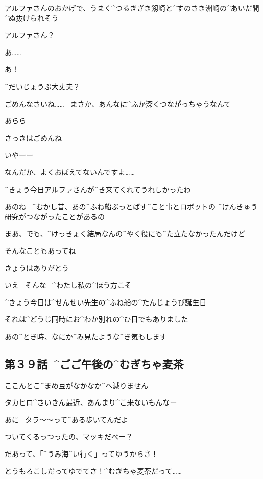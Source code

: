 \page
\Sensei アルファさんのおかげで、うまく^{つるぎざき}{剱崎}と^{すのさき}{洲崎}の^{あいだ}{間}^{ぬ}{抜}けられそう

\Sensei アルファさん？

\page[94]
\Alpha あ……

\Sensei あ！

\Sensei ^{だいじょうぶ}{大丈夫}？

\Sensei ごめんなさいね……
\ まさか、あんなに^{ふか}{深}くつながっちゃうなんて

\page
\Sensei あらら

\page
\Sensei さっきはごめんね

\Alpha いやーー

\Alpha なんだか、よくおぼえてないんですよ……

\Sensei ^{きょう}{今日}アルファさんが^{き}{来}てくれてうれしかったわ

\Sensei あのね
\ ^{むかし}{昔}、あの^{ふね}{船}ぶっとばす^{こと}{事}とロボットの
^{けんきゅう}{研究}がつながったことがあるの

\Sensei まあ、でも、^{けっきょく}{結局}なんの^{やく}{役}にも^{た}{立}たなかったんだけど

\Sensei そんなこともあってね

\page
\Sensei きょうはありがとう

\Alpha いえ
\ そんな
\ ^{わたし}{私}の^{ほう}{方}こそ

\Alpha ^{きょう}{今日}は^{せんせい}{先生}の^{ふね}{船}の^{たんじょうび}{誕生日}

\Alpha それは^{どうじ}{同時}にお^{わか}{別}れの^{ひ}{日}でもありました

\page
\Alpha あの^{とき}{時}、なにか^{み}{見}たような^{き}{気}もします


\subsection{第３９話\ ^{ごご}{午後}の^{むぎちゃ}{麦茶}}

\page[100]
\Alpha ここんとこ^{まめ}{豆}がなかなか^{へ}{減}りません

\page
\Alpha タカヒロ^{さいきん}{最近}、あんまり^{こ}{来}ないもんなー

\page[103]
\Takahiro あに
\ タラ〜〜って^{ある}{歩}いてんだよ

\Takahiro ついてくるっつったの、マッキだべー？

\Makki だあって、「^{うみ}{海}^{い}{行}く」ってゆうからさ！

\Makki とうもろこしだってゆでてさ！^{むぎちゃ}{麦茶}だって……

